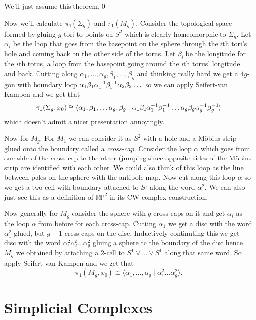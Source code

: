 \documentclass{article}
\begin{document}
\pf We'll just assume this theorem.\qed\par
Now we'll calculate $ \pi_1(\Sigma_g) $ and $ \pi_1(M_g) $. Consider the topological space formed by gluing $ g $ tori to points on $ S^2 $ which is clearly homeomorphic to $ \Sigma_g $. Let $ \alpha_i $ be the loop that goes from the basepoint on the sphere through the $ i $th tori's hole and coming back on the other side of the torus. Let $ \beta_i $ be the longitude for the $ i $th torus, a loop from the basepoint going around the $ i $th torus' longitude and back. Cutting along $ \alpha_1,\dots, \alpha_g, \beta_1,\dots, \beta_g $ and thinking really hard we get a $ 4g $-gon with boundary loop $ \alpha_1\beta_1{\alpha}^{-1}_1{\beta}^{-1}_1\alpha_2\beta_2\dots $ so we can apply Seifert-van Kampen and we get that
\[
  \pi_1(\Sigma_g,x_0) \cong \langle \alpha_1,\beta_1,\dots \alpha_g,\beta_g\mid \alpha_1\beta_1{\alpha}^{-1}_1{\beta}^{-1}_1\dots \alpha_g\beta_g{\alpha}^{-1}_g{\beta}^{-1}_g\rangle
\]
which doesn't admit a nicer presentation annoyingly.\par
Now for $ M_g $. For $ M_1 $ we can consider it as $ S^2 $ with a hole and a M\"obius strip glued onto the boundary called a \textit{cross-cap}. Consider the loop $ \alpha $ which goes from one side of the cross-cap to the other (jumping since opposite sides of the M\"obius strip are identified with each other. We could also think of this loop as the line between poles on the sphere with the antipole map. Now cut along this loop $ \alpha $ so we get a two cell with boundary attached to $ S^1 $ along the word $ \alpha^2 $. We can also just see this as a definition of $ \mathbb{RP}^2 $ in its CW-complex construction.\par
Now generally for $ M_g $ consider the sphere with $ g $ cross-caps on it and get $ \alpha_i $ as the loop $ \alpha $ from before for each cross-cap. Cutting $ \alpha_1 $ we get a disc with the word $ \alpha_1^2 $ glued, but $ g-1 $ cross caps on the disc. Inductively continuting this we get disc with the word $ \alpha_1^2\alpha_2^2\dots \alpha_g^2 $ gluing a sphere to the boundary of the disc hence $ M_g $ we obtained by attaching a $ 2 $-cell to $ S^1\vee \dots \vee S^1 $ along that same word. So apply Seifert-van Kampen and we get that
\[
  \pi_1(M_g,x_0) \cong \langle \alpha_1,\dots, \alpha_g \mid \alpha_1^2\dots \alpha_g^2\rangle.
\]
\section{Simplicial Complexes}
\end{document}
